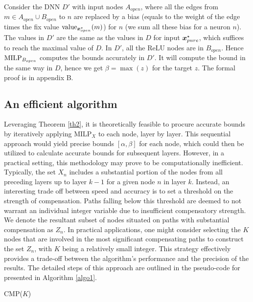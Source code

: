 Consider the DNN $D'$ with input nodes $A_{open}$, where all the 
edges from $m \in A_{open} \cup B_{open}$ to $n$ are replaced by a bias 
(equals to the weight of the edge times the fix value ${\textrm{value}}_{\boldsymbol{x}^\star_{open}}(m)$) for $n$ (we sum all these bias for a neuron $n$).
The values in $D'$ are the same as the values in $D$ for input $\boldsymbol{x}^{\star}_{pure}$,
which suffices to reach the maximal value of $D$.
In $D'$, all the ReLU nodes are in $B_{open}$. 
Hence ${\textrm{MILP}}_{B_{open}}$ computes the bounds accurately in $D'$.
It will compute the bound in the same way in $D$, hence we get $\beta=\max(z)$ for the target $z$. The formal proof is in appendix B.


\subsection{An efficient algorithm}


Leveraging Theorem \ref{th2}, it is theoretically feasible to procure accurate bounds by iteratively applying MILP$_{X}$ to each node, layer by layer. This sequential approach would yield precise bounds $[\alpha,\beta]$ for each node, which could then be utilized to calculate accurate bounds for subsequent layers. However, in a practical setting, this methodology may prove to be computationally inefficient. Typically, the set $X_n$ includes a substantial portion of the nodes from all preceding layers up to layer $k-1$ for a given node $n$ in layer $k$. Instead, an interesting trade off between speed and accuracy is to set a threshold on the strength of compensation. Paths falling below this threshold are deemed to not warrant an individual integer variable due to insufficient compensatory strength. We denote the resultant subset of nodes situated on paths with substantial compensation as $Z_n$. In practical applications, one might consider selecting the $K$ nodes that are involved in the most significant compensating paths to construct the set $Z_n$, with $K$ being a relatively small integer. This strategy effectively provides a trade-off between the algorithm's performance and the precision of the results. The detailed steps of this approach are outlined in the pseudo-code for \CMP presented in Algorithm \ref{algo1}.






\begin{algorithm}[b!]
	\caption{CMP($K$)}
	\label{algo1}
	
	
\end{algorithm}	




